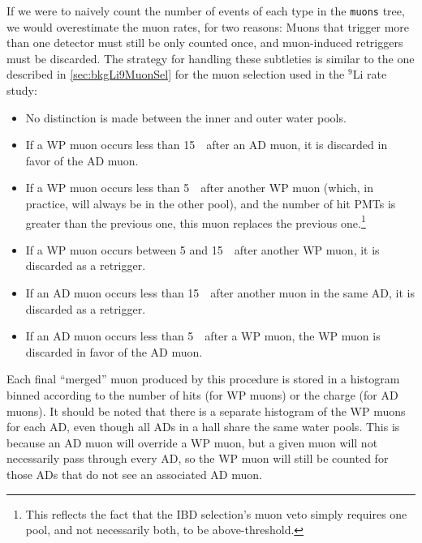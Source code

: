 \documentclass[../thesis.tex]{subfiles}
\begin{document}
If we were to naively count the number of events of each type in the \texttt{muons} tree, we would overestimate the muon rates, for two reasons: Muons that trigger more than one detector must still be only counted once, and muon-induced retriggers must be discarded. The strategy for handling these subtleties is similar to the one described in \autoref{sec:bkgLi9MuonSel} for the muon selection used in the $^9$Li rate study:

\begin{itemize}
\item No distinction is made between the inner and outer water pools.
\item If a WP muon occurs less than 15~\us\ after an AD muon, it is discarded in favor of the AD muon.
\item If a WP muon occurs less than 5~\us\ after another WP muon (which, in practice, will always be in the other pool), and the number of hit PMTs is greater than the previous one, this muon replaces the previous one.\footnote{This reflects the fact that the IBD selection's muon veto simply requires one pool, and not necessarily both, to be above-threshold.}
\item If a WP muon occurs between 5 and 15~\us\ after another WP muon, it is discarded as a retrigger.
\item If an AD muon occurs less than 15~\us\ after another muon in the same AD, it is discarded as a retrigger.
\item If an AD muon occurs less than 5~\us\ after a WP muon, the WP muon is discarded in favor of the AD muon.
\end{itemize}

Each final ``merged'' muon produced by this procedure is stored in a histogram binned according to the number of hits (for WP muons) or the charge (for AD muons). It should be noted that there is a separate histogram of the WP muons for each AD, even though all ADs in a hall share the same water pools. This is because an AD muon will override a WP muon, but a given muon will not necessarily pass through every AD, so the WP muon will still be counted for those ADs that do not see an associated AD muon.

\begin{comment}
  XXX local slides from mid-late Oct for retrigger plots. See misc_ana/MuonVetoEff/condenser4retrig.

Are our efficiencies biased because we don't count for the'' `muon multiplicity efficiency' coming from being falsely ignored as a retrigger?
\end{comment}
\end{document}
